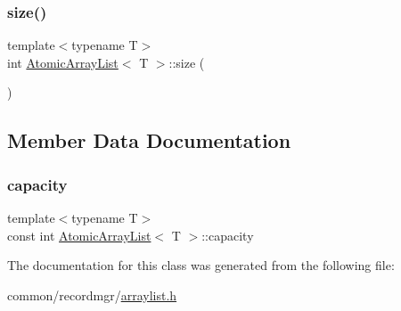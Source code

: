\mbox{\label{classAtomicArrayList_ab180e7e26cfa160e1ea31c0c911da51e}} 
\subsubsection{\texorpdfstring{size()}{size()}}
{\footnotesize\ttfamily template$<$typename T$>$ \\
int \hyperlink{classAtomicArrayList}{Atomic\+Array\+List}$<$ T $>$\+::size (\begin{DoxyParamCaption}{ }\end{DoxyParamCaption})\hspace{0.3cm}{\ttfamily [inline]}}



\subsection{Member Data Documentation}
\mbox{\label{classAtomicArrayList_a2efa86441dbc7ef4d36ed772fb352a71}} 
\subsubsection{\texorpdfstring{capacity}{capacity}}
{\footnotesize\ttfamily template$<$typename T$>$ \\
const int \hyperlink{classAtomicArrayList}{Atomic\+Array\+List}$<$ T $>$\+::capacity}



The documentation for this class was generated from the following file\+:\begin{DoxyCompactItemize}
\item 
common/recordmgr/\hyperlink{arraylist_8h}{arraylist.\+h}\end{DoxyCompactItemize}

